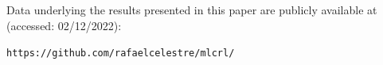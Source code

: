 \documentclass{iucr}
\begin{document}







Data underlying the results presented in this paper are publicly available at (accessed: 02/12/2022):
\begin{center}
\small{\texttt{https://github.com/rafaelcelestre/mlcrl/}}
\end{center}


\end{document}
